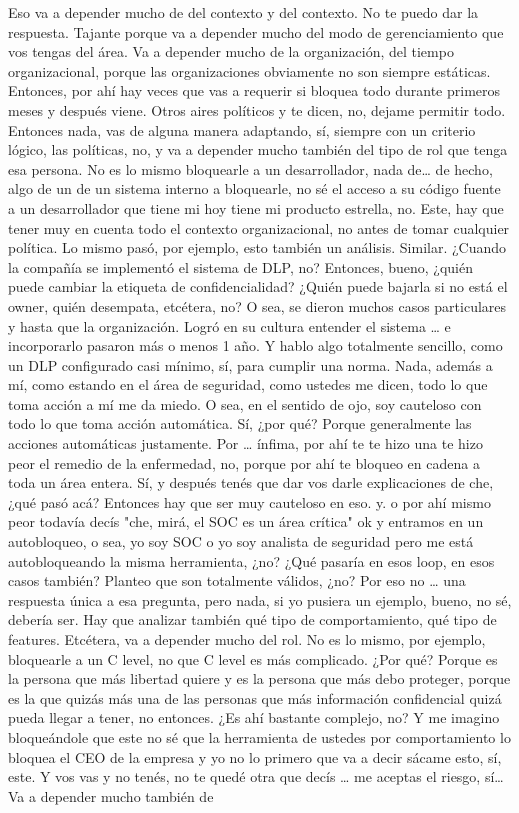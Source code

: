 \begin{description}[leftmargin=0cm, labelsep=0.5cm]
    \item[\textbf{PEÑA ALEJANDRO FRANCISCO:}] Eso va a depender mucho de del contexto y del contexto. No te puedo dar la respuesta. Tajante porque va a depender mucho del modo de gerenciamiento que vos tengas del área. Va a depender mucho de la organización, del tiempo organizacional, porque las organizaciones obviamente no son siempre estáticas. Entonces, por ahí hay veces que vas a requerir si bloquea todo durante primeros meses y después viene. Otros aires políticos y te dicen, no, dejame permitir todo. Entonces nada, vas de alguna manera adaptando, sí, siempre con un criterio lógico, las políticas, no, y va a depender mucho también del tipo de rol que tenga esa persona. No es lo mismo bloquearle a un desarrollador, nada de… de hecho, algo de un de un sistema interno a bloquearle, no sé el acceso a su código fuente a un desarrollador que tiene mi hoy tiene mi producto estrella, no. Este, hay que tener muy en cuenta todo el contexto organizacional, no antes de tomar cualquier política. Lo mismo pasó, por ejemplo, esto también un análisis. Similar. ¿Cuando la compañía se implementó el sistema de DLP, no? Entonces, bueno, ¿quién puede cambiar la etiqueta de confidencialidad? ¿Quién puede bajarla si no está el owner, quién desempata, etcétera, no? O sea, se dieron muchos casos particulares y hasta que la organización. Logró en su cultura entender el sistema … e incorporarlo pasaron más o menos 1 año. Y hablo algo totalmente sencillo, como un DLP configurado casi mínimo, sí, para cumplir una norma. Nada, además a mí, como estando en el área de seguridad, como ustedes me dicen, todo lo que toma acción a mí me da miedo. O sea, en el sentido de ojo, soy cauteloso con todo lo que toma acción automática. Sí, ¿por qué? Porque generalmente las acciones automáticas justamente. Por … ínfima, por ahí te te hizo una te hizo peor el remedio de la enfermedad, no, porque por ahí te bloqueo en cadena a toda un área entera. Sí, y después tenés que dar vos darle explicaciones de che, ¿qué pasó acá? Entonces hay que ser muy cauteloso en eso. y. o por ahí mismo peor todavía decís "che, mirá, el SOC es un área crítica" ok y entramos en un autobloqueo, o sea, yo soy SOC o yo soy analista de seguridad pero me está autobloqueando la misma herramienta, ¿no? ¿Qué pasaría en esos loop, en esos casos también? Planteo que son totalmente válidos, ¿no? Por eso no … una respuesta única a esa pregunta, pero nada, si yo pusiera un ejemplo, bueno, no sé, debería ser. Hay que analizar también qué tipo de comportamiento, qué tipo de features. Etcétera, va a depender mucho del rol. No es lo mismo, por ejemplo, bloquearle a un C level, no que C level es más complicado. ¿Por qué? Porque es la persona que más libertad quiere y es la persona que más debo proteger, porque es la que quizás más una de las personas que más información confidencial quizá pueda llegar a tener, no entonces. ¿Es ahí bastante complejo, no? Y me imagino bloqueándole que este no sé que la herramienta de ustedes por comportamiento lo bloquea el CEO de la empresa y yo no lo primero que va a decir sácame esto, sí, este. Y vos vas y no tenés, no te quedé otra que decís … me aceptas el riesgo, sí… Va a depender mucho también de 
\end{description}
